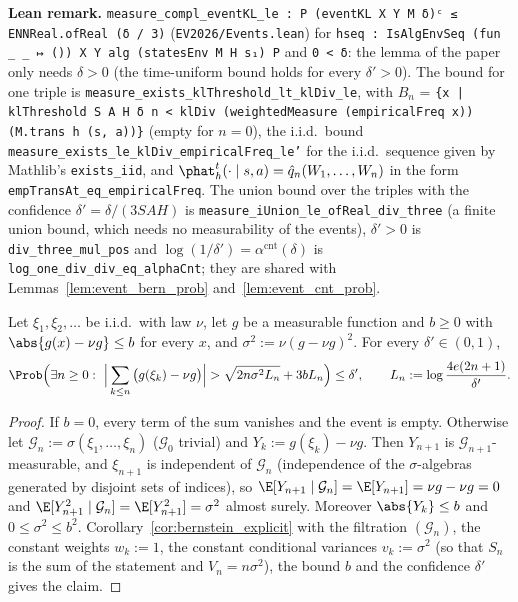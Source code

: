 \textbf{Lean remark.} \texttt{measure\_compl\_eventKL\_le : P (eventKL X Y M δ)ᶜ ≤ ENNReal.ofReal (δ / 3)}
(\texttt{EV2026/Events.lean}) for \texttt{hseq : IsAlgEnvSeq (fun \_ \_ ↦ ()) X Y alg (statesEnv M H s₁) P}
and \texttt{0 < δ}: the lemma of the paper only needs $\delta > 0$ (the time-uniform bound holds for
every $\delta' > 0$). The bound for one triple is \texttt{measure\_exists\_klThreshold\_lt\_klDiv\_le},
with $B_n$ = \texttt{\{x | klThreshold S A H δ n < klDiv (weightedMeasure (empiricalFreq x)) (M.trans h (s, a))\}}
(empty for $n = 0$), the i.i.d.\ bound \texttt{measure\_exists\_le\_klDiv\_empiricalFreq\_le'} for the
i.i.d.\ sequence given by Mathlib's \texttt{exists\_iid}, and
$\phat_h^t(\cdot \mid s, a) = \hat q_n(W_1, \dots, W_n)$ in the form
\texttt{empTransAt\_eq\_empiricalFreq}. The union bound over the triples with the confidence
$\delta' = \delta/(3SAH)$ is \texttt{measure\_iUnion\_le\_ofReal\_div\_three} (a finite union bound,
which needs no measurability of the events), $\delta' > 0$ is \texttt{div\_three\_mul\_pos} and
$\log(1/\delta') = \alpha^{\mathrm{cnt}}(\delta)$ is \texttt{log\_one\_div\_div\_eq\_alphaCnt}; they are
shared with Lemmas~\ref{lem:event_bern_prob} and~\ref{lem:event_cnt_prob}.

\begin{lemma}\label{lem:emp_bernstein_iid}
\leanok
{}
Let $\xi_1, \xi_2, \dots$ be i.i.d.\ with law $\nu$, let $g$ be a measurable function and $b \ge 0$
with $\abs{g(x) - \nu g} \le b$ for every $x$, and $\sigma^2 := \nu(g - \nu g)^2$. For every
$\delta' \in (0, 1)$,
\[
  \Prob\Big(\exists n \ge 0 :\ \Big|\sum_{k \le n} \big(g(\xi_k) - \nu g\big)\Big| > \sqrt{2 n \sigma^2 L_n} + 3 b L_n\Big) \le \delta' ,
  \qquad L_n := \log\frac{4e(2n + 1)}{\delta'} .
\]
\end{lemma}

\begin{proof}
\leanok
If $b = 0$, every term of the sum vanishes and the event is empty. Otherwise let
$\mathcal G_n := \sigma(\xi_1, \dots, \xi_n)$ ($\mathcal G_0$ trivial) and $Y_k := g(\xi_k) - \nu g$.
Then $Y_{n+1}$ is $\mathcal G_{n+1}$-measurable, and $\xi_{n+1}$ is independent of $\mathcal G_n$
(independence of the $\sigma$-algebras generated by disjoint sets of indices), so
$\E[Y_{n+1} \mid \mathcal G_n] = \E[Y_{n+1}] = \nu g - \nu g = 0$ and
$\E[Y_{n+1}^2 \mid \mathcal G_n] = \E[Y_{n+1}^2] = \sigma^2$ almost surely. Moreover $\abs{Y_k} \le b$
and $0 \le \sigma^2 \le b^2$. Corollary~\ref{cor:bernstein_explicit} with the filtration
$(\mathcal G_n)$, the constant weights $w_k := 1$, the constant conditional variances
$v_k := \sigma^2$ (so that $S_n$ is the sum of the statement and $V_n = n \sigma^2$), the bound $b$
and the confidence $\delta'$ gives the claim.
\end{proof}

